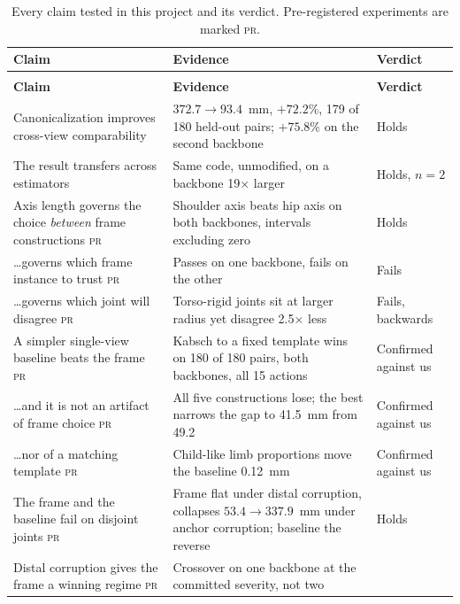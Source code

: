 \documentclass[12pt,a4paper]{report}
\begin{document}
{\fontsize{9}{11}\selectfont
\setlength{\tabcolsep}{4pt}
\begin{longtable}{>{\raggedright\arraybackslash}p{6.2cm}>{\raggedright\arraybackslash}p{5.0cm}>{\raggedright\arraybackslash}p{2.3cm}}
\caption[Every claim tested, and its verdict]{Every claim tested in this project and its verdict. Pre-registered experiments are marked \textsc{pr}.}\label{tab:summary}\\
\hline
\textbf{Claim} & \textbf{Evidence} & \textbf{Verdict} \\
\hline
\endfirsthead
\multicolumn{3}{l}{\textit{Table \thetable\ (continued)}}\\
\hline
\textbf{Claim} & \textbf{Evidence} & \textbf{Verdict} \\
\hline
\endhead
\hline
\endfoot
Canonicalization improves cross-view comparability
 & $372.7 \to 93.4$~mm, $+72.2\%$, 179 of 180 held-out pairs; $+75.8\%$ on the second backbone
 & Holds \\
The result transfers across estimators
 & Same code, unmodified, on a backbone 19$\times$ larger
 & Holds, $n=2$ \\
Axis length governs the choice \emph{between} frame constructions \textsc{pr}
 & Shoulder axis beats hip axis on both backbones, intervals excluding zero
 & Holds \\
\ldots governs which frame instance to trust \textsc{pr}
 & Passes on one backbone, fails on the other
 & Fails \\
\ldots governs which joint will disagree \textsc{pr}
 & Torso-rigid joints sit at larger radius yet disagree 2.5$\times$ less
 & Fails, backwards \\
A simpler single-view baseline beats the frame \textsc{pr}
 & Kabsch to a fixed template wins on 180 of 180 pairs, both backbones, all 15 actions
 & Confirmed against us \\
\ldots and it is not an artifact of frame choice \textsc{pr}
 & All five constructions lose; the best narrows the gap to 41.5~mm from 49.2
 & Confirmed against us \\
\ldots nor of a matching template \textsc{pr}
 & Child-like limb proportions move the baseline 0.12~mm
 & Confirmed against us \\
The frame and the baseline fail on disjoint joints \textsc{pr}
 & Frame flat under distal corruption, collapses $53.4 \to 337.9$~mm under anchor corruption; baseline the reverse
 & Holds \\
Distal corruption gives the frame a winning regime \textsc{pr}
 & Crossover on one backbone at the committed severity, not two

\end{longtable}}
\end{document}
